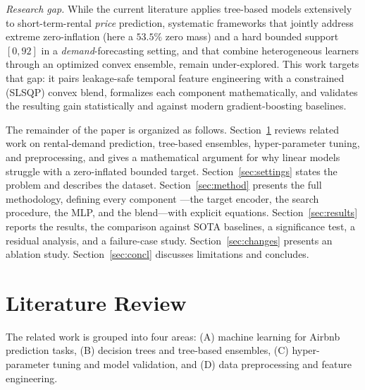 \documentclass[journal]{IEEEtran}
\begin{document}
\emph{Research gap.} While the current literature applies tree-based models
extensively to short-term-rental \emph{price} prediction, systematic frameworks
that jointly address extreme zero-inflation (here a $53.5\%$ zero mass) and a
hard bounded support $[0,92]$ in a \emph{demand}-forecasting setting, and that
combine heterogeneous learners through an optimized convex ensemble, remain
under-explored. This work targets that gap: it pairs leakage-safe temporal
feature engineering with a constrained (SLSQP) convex blend, formalizes each
component mathematically, and validates the resulting gain statistically and
against modern gradient-boosting baselines.

The remainder of the paper is organized as follows. Section~\ref{sec:lit}
reviews related work on rental-demand prediction, tree-based ensembles,
hyper-parameter tuning, and preprocessing, and gives a mathematical argument for
why linear models struggle with a zero-inflated bounded target.
Section~\ref{sec:settings} states the problem and describes the dataset.
Section~\ref{sec:method} presents the full methodology, defining every component
---the target encoder, the search procedure, the MLP, and the blend---with
explicit equations. Section~\ref{sec:results} reports the results, the
comparison against SOTA baselines, a significance test, a residual analysis, and
a failure-case study. Section~\ref{sec:changes} presents an ablation study.
Section~\ref{sec:concl} discusses limitations and concludes.

\section{Literature Review}
\label{sec:lit}
The related work is grouped into four areas: (A) machine learning for Airbnb
prediction tasks, (B) decision trees and tree-based ensembles, (C)
hyper-parameter tuning and model validation, and (D) data preprocessing and
feature engineering.
\end{document}
